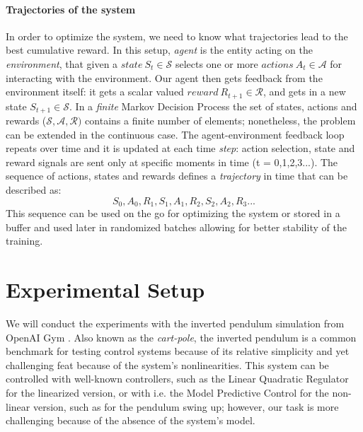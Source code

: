 \documentclass[11pt]{article}
\begin{document}
\paragraph{Trajectories of the system}
In order to optimize the system, we need to know what trajectories lead to the best cumulative reward. In this setup, \textit{agent} is the entity acting on the \textit{environment}, that given a $state \ S_t \in \mathcal{S}$ selects one or more $actions \ A_t \in \mathcal{A}$ for interacting with the environment. Our agent then gets feedback from the environment itself: it gets a scalar valued $reward \ R_{t+1} \in \mathcal{R}$, and gets in a new state $S_{t+1} \in \mathcal{S}$. In a \textit{finite} Markov Decision Process the set of states, actions and rewards ($\mathcal{S},\mathcal{A},\mathcal{R})$ contains a finite number of elements; nonetheless, the problem can be extended in the continuous case. The agent-environment feedback loop repeats over time and it is updated at each time \textit{step}: action selection, state and reward signals are sent only at specific moments in time (t = 0,1,2,3...). The sequence of actions, states and rewards defines a \textit{trajectory} in time that can be described as: 
\begin{equation}
	S_0, A_0, R_1, S_1, A_1, R_2, S_2, A_2, R_3... 
\end{equation}
This sequence can be used on the go for optimizing the system or stored in a buffer and used later in randomized batches allowing for better stability of the training.


\section{Experimental Setup}

We will conduct the experiments with the inverted pendulum simulation from OpenAI Gym \cite{brockman2016openai}. Also known as the \textit{cart-pole}, the inverted pendulum is a common benchmark for testing control systems because of its relative simplicity and yet challenging feat because of the system's nonlinearities. This system can be controlled with well-known controllers, such as the Linear Quadratic Regulator for the linearized version, or with i.e. the Model Predictive Control for the non-linear version, such as for the pendulum swing up; however, our task is more challenging because of the absence of the system's model.
\end{document}
